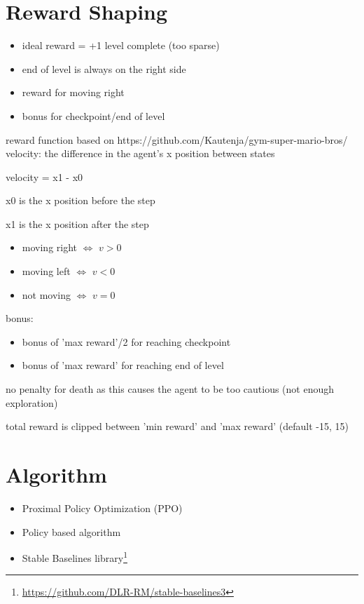 \documentclass{article}
\begin{document}
    \section{Reward Shaping}
    \begin{itemize}
        \item ideal reward = +1 level complete (too sparse)
        \item end of level is always on the right side
        \item reward for moving right
        \item bonus for checkpoint/end of level
    \end{itemize}
    reward function based on https://github.com/Kautenja/gym-super-mario-bros/
    velocity: the difference in the agent's x position between states

    velocity = x1 - x0

    x0 is the x position before the step

    x1 is the x position after the step

    \begin{itemize}
        \item moving right $\Leftrightarrow$ $v > 0$
        \item moving left $\Leftrightarrow$ $v < 0$
        \item not moving $\Leftrightarrow$ $v = 0$
    \end{itemize}

    bonus:
    \begin{itemize}
        \item bonus of 'max reward'/2 for reaching checkpoint
        \item bonus of 'max reward' for reaching end of level
    \end{itemize}
    no penalty for death as this causes the agent to be too cautious (not enough exploration)

    total reward is clipped between 'min reward' and 'max reward' (default -15, 15)

    \section{Algorithm}
    \begin{itemize}
        \item Proximal Policy Optimization (PPO)
        \item Policy based algorithm
        \item Stable Baselines library\footnote{\url{https://github.com/DLR-RM/stable-baselines3}}
    \end{itemize}
\end{document}

